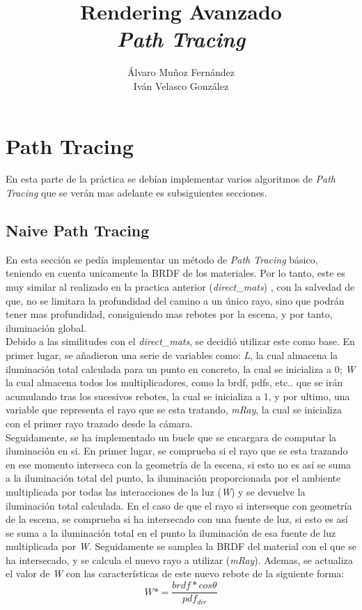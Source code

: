 \documentclass[10pt,oneside,a4paper]{article}
\begin{document}
\begin{titlepage}

\title{\Huge Rendering Avanzado  \\[0.7in] \LARGE \textit{Path Tracing}\\[3.6in]}
\date{}
\author{Álvaro Muñoz Fernández\\
Iván Velasco González}
\maketitle
\thispagestyle{empty}
\end{titlepage}

\section{Path Tracing}
En esta parte de la práctica se debían implementar varios algoritmos de \textit{ Path Tracing} que se verán mas adelante es subsiguientes secciones.
\subsection{Naive Path Tracing}
En esta sección se pedía implementar un método de \textit{Path Tracing} básico, teniendo en cuenta unicamente la BRDF de los materiales. Por lo tanto, este es muy similar al realizado en la practica anterior (\textit{direct\_mats}) , con la salvedad de que, no se limitara la profundidad del camino a un único rayo, sino que podrán tener mas profundidad, consiguiendo mas rebotes por la escena, y por tanto, iluminación global.\\

Debido a las similitudes con el \textit{direct\_mats}, se decidió utilizar este como base. En primer lugar, se añadieron una serie de variables como: \textit{L}, la cual almacena la iluminación total calculada para un punto en concreto, la cual se inicializa a 0; \textit{W} la cual almacena todos los multiplicadores, como la brdf, pdfs, etc.. que se irán acumulando tras los sucesivos rebotes, la cual se inicializa a 1, y por ultimo, una variable que representa el rayo que se esta tratando, \textit{mRay}, la cual se inicializa con el primer rayo trazado desde la cámara.\\

Seguidamente, se ha implementado un bucle que se encargara de computar la iluminación en si. En primer lugar, se comprueba si el rayo que se esta trazando en ese momento interseca con la geometría de la escena, si esto no es así se suma a la iluminación total del punto, la iluminación proporcionada por el ambiente multiplicada por todas las interacciones de la luz (\textit{W}) y se devuelve la iluminación total calculada. En el caso de que el rayo si interseque con geometría de la escena, se comprueba si ha intersecado con una fuente de luz, si esto es así se suma a la iluminación total en el punto la iluminación de esa fuente de luz multiplicada por \textit{W}. Seguidamente se samplea la BRDF del  material con el que se ha intersecado, y se calcula el nuevo rayo a utilizar (\textit{mRay}). Ademas, se actualiza el valor de \textit{W} con las características de este nuevo rebote de la siguiente forma:
$$W *= \frac{brdf * cos\theta}{pdf_{dir}}$$
\end{document}
